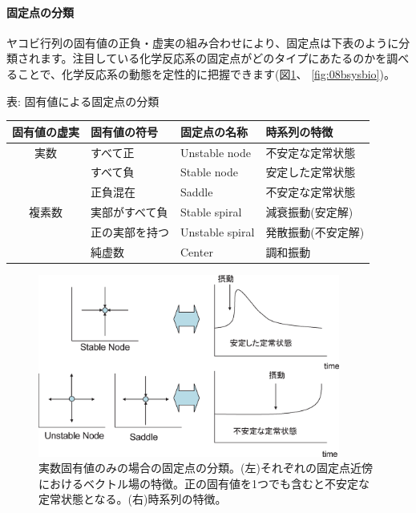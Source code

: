 \paragraph{固定点の分類} ヤコビ行列の固有値の正負・虚実の組み合わせにより、固定点は下表のように分類されます。注目している化学反応系の固定点がどのタイプにあたるのかを調べることで、化学反応系の動態を定性的に把握できます(図\ref{fig:08asysbio}、 \ref{fig:08bsysbio})。\\

\begin{center}
表: 固有値による固定点の分類\\
\begin{tabular}{clll}
\hline
固有値の虚実 & 固有値の符号       & 固定点の名称 & 時系列の特徴 \\
\hline
実数  & すべて正         & Unstable node  & 不安定な定常状態\\
　　　& すべて負         & Stable node    & 安定した定常状態\\
      & 正負混在         & Saddle         & 不安定な定常状態\\
\hline
複素数 & 実部がすべて負  & Stable spiral  & 減衰振動(安定解)\\
　　　 & 正の実部を持つ  & Unstable spiral & 発散振動(不安定解)\\
       & 純虚数          & Center          & 調和振動\\
\hline
\end{tabular}
\end{center}

\begin{figure}[ht]
        \centering \includegraphics[height=6cm]{../Bifurcation/img/node_stability.eps}
                \caption{実数固有値のみの場合の固定点の分類。(左)それぞれの固定点近傍におけるベクトル場の特徴。正の固有値を1つでも含むと不安定な定常状態となる。(右)時系列の特徴。}
        \label{fig:08asysbio} \end{figure}
        
